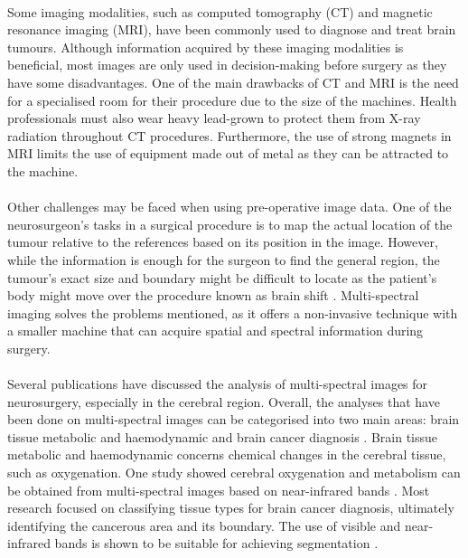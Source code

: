 \documentclass[12pt,oneside]{report}
\begin{document}
\paragraph{}
Some imaging modalities, such as computed tomography (CT) and magnetic resonance imaging (MRI), have been commonly used to diagnose and treat brain tumours. Although information acquired by these imaging modalities is beneficial, most images are only used in decision-making before surgery as they have some disadvantages. One of the main drawbacks of CT and MRI is the need for a specialised room for their procedure due to the size of the machines. Health professionals must also wear heavy lead-grown to protect them from X-ray radiation throughout CT procedures. Furthermore, the use of strong magnets in MRI limits the use of equipment made out of metal as they can be attracted to the machine.

\paragraph{}
Other challenges may be faced when using pre-operative image data. One of the neurosurgeon’s tasks in a surgical procedure is to map the actual location of the tumour relative to the references based on its position in the image. However, while the information is enough for the surgeon to find the general region, the tumour's exact size and boundary might be difficult to locate as the patient’s body might move over the procedure known as brain shift \cite{gerard_brain_2017}. Multi-spectral imaging solves the problems mentioned, as it offers a non-invasive technique with a smaller machine that can acquire spatial and spectral information during surgery.

\paragraph{}
Several publications have discussed the analysis of multi-spectral images for neurosurgery, especially in the cerebral region. Overall, the analyses that have been done on multi-spectral images can be categorised into two main areas: brain tissue metabolic and haemodynamic and brain cancer diagnosis \cite{wu_review_2022}. Brain tissue metabolic and haemodynamic concerns chemical changes in the cerebral tissue, such as oxygenation. One study showed cerebral oxygenation and metabolism can be obtained from multi-spectral images based on near-infrared bands \cite{nguyen_hyperspectral_2019}. Most research focused on classifying tissue types for brain cancer diagnosis, ultimately identifying the cancerous area and its boundary. The use of visible and near-infrared bands is shown to be suitable for achieving segmentation \cite{fabelo_helicoid_2016}. 
\end{document}
